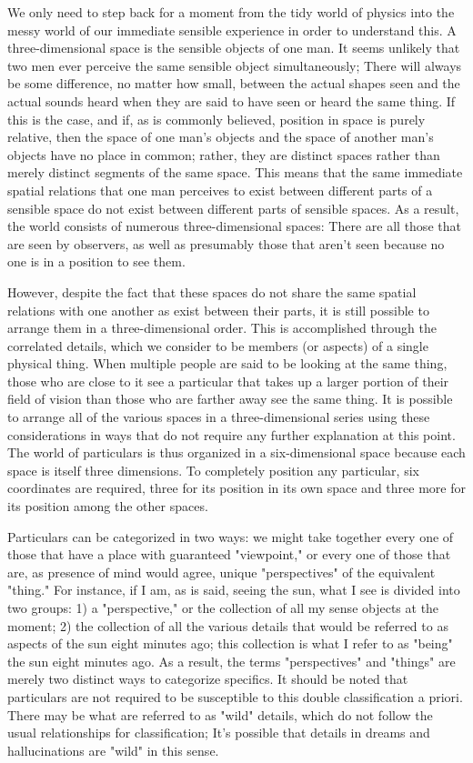 \documentclass[a4paper,12pt]{book}[2004/02/16]
\theoremstyle{ilemma}
\theoremstyle{itheorem}
\theoremstyle{iother}
\theoremstyle{icorollary}
\theoremstyle{numcorollary}
\theoremstyle{idefinition}
\begin{document}
We only need to step back for a moment from the tidy world of physics into the messy world of our immediate sensible experience in order to understand this. A three-dimensional space is the sensible objects of one man. It seems unlikely that two men ever perceive the same sensible object simultaneously; There will always be some difference, no matter how small, between the actual shapes seen and the actual sounds heard when they are said to have seen or heard the same thing. If this is the case, and if, as is commonly believed, position in space is purely relative, then the space of one man's objects and the space of another man's objects have no place in common; rather, they are distinct spaces rather than merely distinct segments of the same space. This means that the same immediate spatial relations that one man perceives to exist between different parts of a sensible space do not exist between different parts of sensible spaces. As a result, the world consists of numerous three-dimensional spaces: There are all those that are seen by observers, as well as presumably those that aren't seen because no one is in a position to see them.

However, despite the fact that these spaces do not share the same spatial relations with one another as exist between their parts, it is still possible to arrange them in a three-dimensional order. This is accomplished through the correlated details, which we consider to be members (or aspects) of a single physical thing. When multiple people are said to be looking at the same thing, those who are close to it see a particular that takes up a larger portion of their field of vision than those who are farther away see the same thing. It is possible to arrange all of the various spaces in a three-dimensional series using these considerations in ways that do not require any further explanation at this point. The world of particulars is thus organized in a six-dimensional space because each space is itself three dimensions. To completely position any particular, six coordinates are required, three for its position in its own space and three more for its position among the other spaces.

Particulars can be categorized in two ways: we might take together
every one of those that have a place with guaranteed "viewpoint," or every one of those that are,
as presence of mind would agree, unique "perspectives" of the equivalent "thing."
For instance, if I am, as is said, seeing the sun, what I see is divided into two groups: 1) a "perspective," or the collection of all my sense objects at the moment; 2) the collection of all the various details that would be referred to as aspects of the sun eight minutes ago; this collection is what I refer to as "being" the sun eight minutes ago. As a result, the terms "perspectives" and "things" are merely two distinct ways to categorize specifics. It should be noted that particulars are not required to be susceptible to this double classification a priori. There may be what are referred to as "wild" details, which do not follow the usual relationships for classification; It's possible that details in dreams and hallucinations are "wild" in this sense.
\end{document}

